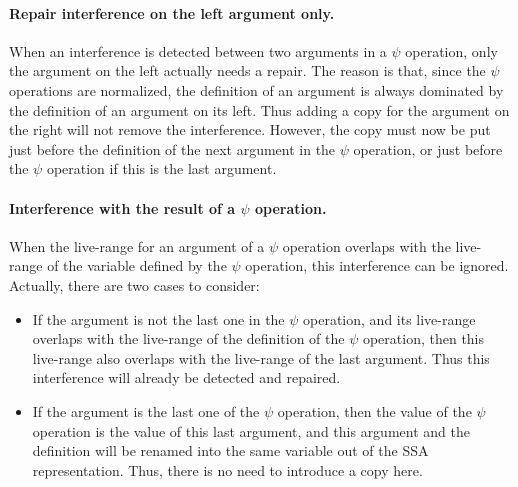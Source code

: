 \paragraph{Repair interference on the left argument only.}

When an interference is detected between two arguments in a $\psi$
operation, only the argument on the left actually needs a repair. The
reason is that, since the $\psi$ operations are normalized, the
definition of an argument is always dominated by the definition of an
argument on its left. Thus adding a copy for the argument on the right
will not remove the interference. However, the copy must now be put
just before the definition of the next argument in the $\psi$
operation, or just before the $\psi$ operation if this is the last
argument.

\paragraph{Interference with the result of a $\psi$ operation.}

When the live-range for an argument of a $\psi$ operation overlaps
with the live-range of the variable defined by the $\psi$ operation,
this interference can be ignored. Actually, there are two cases to
consider:

\begin{itemize}
\item If the argument is not the last one in the $\psi$ operation, and
its live-range overlaps with the live-range of the definition of the
$\psi$ operation, then this live-range also overlaps with the
live-range of the last argument. Thus this interference will already
be detected and repaired.

\item If the argument is the last one of the $\psi$ operation, then
the value of the $\psi$ operation is the value of this last argument,
and this argument and the definition will be renamed into the same
variable out of the SSA representation. Thus, there is no need to
introduce a copy here.
\end{itemize}

